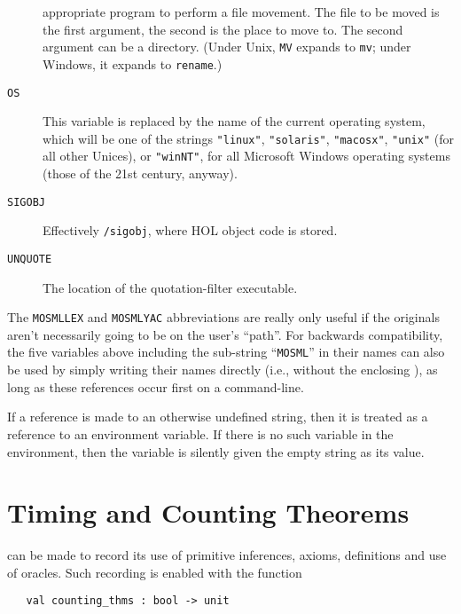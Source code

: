 \begin{description}
  appropriate program to perform a file movement.  The file to be
  moved is the first argument, the second is the place to move to.
  The second argument can be a directory.  (Under Unix, \texttt{MV}
  expands to \texttt{mv}; under Windows, it expands to \texttt{rename}.)
\item[\texttt{OS}] This variable is replaced by the name of the
  current operating system, which will be one of the strings
  \texttt{"linux"}, \texttt{"solaris"}, \texttt{"macosx"},
  \texttt{"unix"} (for all other Unices), or \texttt{"winNT"}, for all
  Microsoft Windows operating systems (those of the 21st century,
  anyway).
\item[\texttt{SIGOBJ}] Effectively \texttt{/sigobj},
  where HOL object code is stored.
  \item[\texttt{UNQUOTE}] The location of the quotation-filter executable.
\end{description}
The \texttt{MOSMLLEX} and \texttt{MOSMLYAC} abbreviations are really
only useful if the originals aren't necessarily going to be on the
user's ``path''.  For backwards compatibility, the five variables
above including the sub-string ``\texttt{MOSML}'' in their names can
also be used by simply writing their names directly (i.e., without the
enclosing \varref{\dots}), as long as these references occur first on
a command-line.

If a reference is made to an otherwise undefined string, then it is
treated as a reference to an environment variable.  If there is no
such variable in the environment, then the variable is silently given
the empty string as its value.



\section{Timing and Counting Theorems}



\HOL{} can be made to record its use of primitive
inferences, axioms, definitions and use of oracles.  Such recording is
enabled with the function

\begin{holboxed}
\begin{verbatim}
   val counting_thms : bool -> unit
\end{verbatim}
\end{holboxed}

